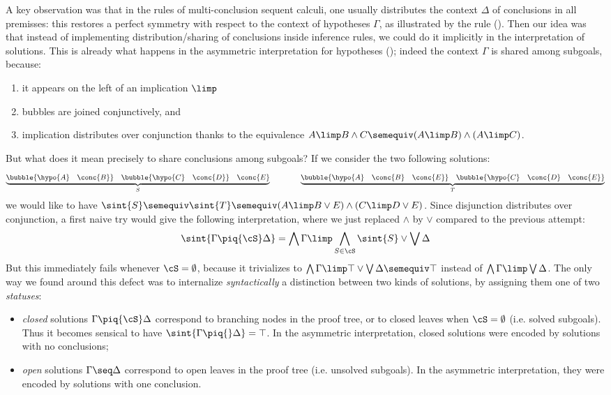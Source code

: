A key observation was that in the rules of multi-conclusion sequent calculi, one
usually distributes the context $\Delta$ of conclusions in all premisses: this
restores a perfect symmetry with respect to the context of hypotheses $\Gamma$,
as illustrated by the {} rule (). Then our
idea was that instead of implementing distribution/sharing of conclusions inside
inference rules, we could do it implicitly in the interpretation of solutions.
This is already what happens in the asymmetric interpretation for hypotheses
(); indeed the context $\Gamma$ is shared among subgoals,
because:
\begin{enumerate}
  \item it appears on the left of an implication $\limp$
  \item bubbles are joined conjunctively, and
  \item implication distributes over conjunction thanks to the equivalence $A
  \limp B \land C \semequiv (A \limp B) \land (A \limp C)$.
\end{enumerate}
But what does it mean precisely to share conclusions among subgoals? If we
consider the two following solutions:
\begin{equation}\label{eq:concdistr}
\underbrace{\bubble{\hypo{A}~~~\conc{B}}~~~\bubble{\hypo{C}~~~\conc{D}}~~~\conc{E}}_{S} \qquad\qquad
\underbrace{\bubble{\hypo{A}~~~\conc{B}~~~\conc{E}}~~~\bubble{\hypo{C}~~~\conc{D}~~~\conc{E}}}_{T}
\end{equation}
we would like to have $\sint{S} \semequiv \sint{T} \semequiv (A \limp B
\lor E) \land (C \limp D \lor E)$. Since disjunction distributes over
conjunction, a first naive try would give the following interpretation, where we
just replaced $\land$ by $\lor$ compared to the previous attempt:
$$
\sint{\Gamma \piq{\cS} \Delta} =
\bigwedge{\Gamma} \limp \bigwedge_{S \in \cS}{\sint{S}} \lor \bigvee \Delta
$$
But this immediately fails whenever $\cS = \emptyset$, because it
trivializes to $\bigwedge \Gamma \limp \top \lor \bigvee \Delta \semequiv \top$
instead of $\bigwedge \Gamma \limp \bigvee \Delta$. The only way we found around
this defect was to internalize \emph{syntactically} a distinction between two
kinds of solutions, by assigning them one of two \emph{statuses}:
\begin{itemize}
  \item \emph{closed} solutions $\Gamma \piq{\cS} \Delta$ correspond
  to branching nodes in the proof tree, or to closed leaves when $\cS =
  \emptyset$ (i.e. solved subgoals). Thus it becomes sensical to have
  $\sint{\Gamma \piq{} \Delta} = \top$. In the asymmetric interpretation,
  closed solutions were encoded by solutions with no conclusions;
  \item \emph{open} solutions $\Gamma \seq \Delta$ correspond to open leaves
  in the proof tree (i.e. unsolved subgoals). In the asymmetric interpretation,
  they were encoded by solutions with one conclusion.
\end{itemize}

